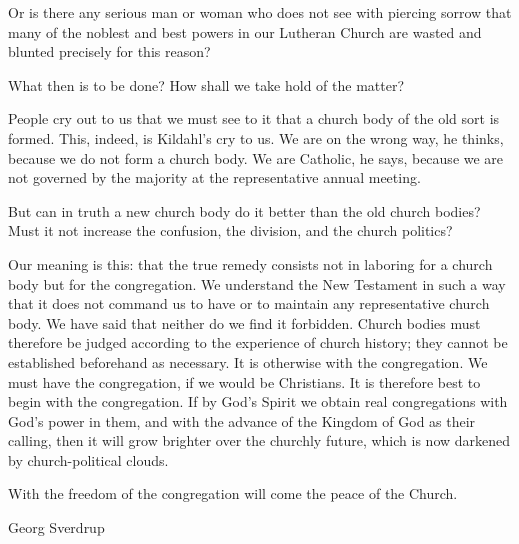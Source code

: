 Or is there any serious man or woman who does not see with piercing sorrow that many of the noblest and best powers in our Lutheran Church are wasted and blunted precisely for this reason?

What then is to be done? How shall we take hold of the matter?

People cry out to us that we must see to it that a church body of the old sort is formed. This, indeed, is Kildahl’s cry to us. We are on the wrong way, he thinks, because we do not form a church body. We are Catholic, he says, because we are not governed by the majority at the representative annual meeting.

But can in truth a new church body do it better than the old church bodies? Must it not increase the confusion, the division, and the church politics?

Our meaning is this: that the true remedy consists not in laboring for a church body but for the congregation. We understand the New Testament in such a way that it does not command us to have or to maintain any representative church body. We have said that neither do we find it forbidden. Church bodies must therefore be judged according to the experience of church history; they cannot be established beforehand as necessary. It is otherwise with the congregation. We must have the congregation, if we would be Christians. It is therefore best to begin with the congregation. If by God’s Spirit we obtain real congregations with God’s power in them, and with the advance of the Kingdom of God as their calling, then it will grow brighter over the churchly future, which is now darkened by church-political clouds.

With the freedom of the congregation will come the peace of the Church.

Georg Sverdrup